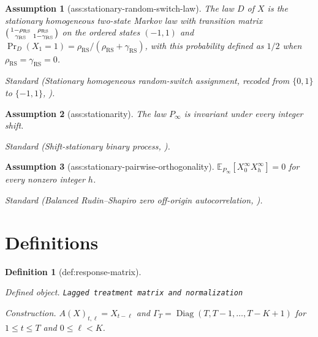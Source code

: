 \documentclass{article}
\newtheorem{assumption}{Assumption}
\newtheorem{definition}{Definition}
\begin{document}
\begin{assumption}[ass:stationary-random-switch-law]\label{ass:stationary-random-switch-law}
The law \(D\) of \(X\) is the stationary homogeneous two-state Markov law with transition matrix \(\begin{psmallmatrix}1-\rho_{\mathrm{RS}}&\rho_{\mathrm{RS}}\\\gamma_{\mathrm{RS}}&1-\gamma_{\mathrm{RS}}\end{psmallmatrix}\) on the ordered states \((-1,1)\) and \(\Pr_D(X_1=1)=\rho_{\mathrm{RS}}/(\rho_{\mathrm{RS}}+\gamma_{\mathrm{RS}})\), with this probability defined as \(1/2\) when \(\rho_{\mathrm{RS}}=\gamma_{\mathrm{RS}}=0\).
\par\smallskip\noindent\emph{Standard} (Stationary homogeneous random-switch assignment, recoded from \(\{0,1\}\) to \(\{-1,1\}\), \cite{GuoLiang2026}).
\end{assumption}

\begin{assumption}[ass:stationarity]\label{ass:stationarity}
The law \(P_{\infty}\) is invariant under every integer shift.
\par\smallskip\noindent\emph{Standard} (Shift-stationary binary process, \cite{Mazac2024}).
\end{assumption}

\begin{assumption}[ass:stationary-pairwise-orthogonality]\label{ass:stationary-pairwise-orthogonality}
\(\mathbb E_{P_{\infty}}[X_0^{\infty}X_h^{\infty}]=0\) for every nonzero integer \(h\).
\par\smallskip\noindent\emph{Standard} (Balanced Rudin--Shapiro zero off-origin autocorrelation, \cite{Mazac2024}).
\end{assumption}

\section{Definitions}

\begin{definition}[def:response-matrix]\label{def:response-matrix}
\par\smallskip\noindent\emph{Defined object.} \texttt{Lagged treatment matrix and normalization}
\par\smallskip\noindent\emph{Construction.} \(A(X)_{t,\ell}=X_{t-\ell}\) and \(\Gamma_T=\operatorname{Diag}(T,T-1,\ldots,T-K+1)\) for \(1\le t\le T\) and \(0\le\ell<K\).
\end{definition}
\end{document}
